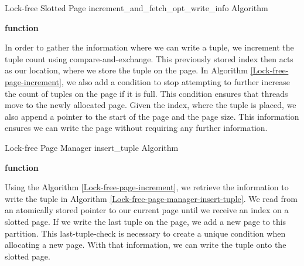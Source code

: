 \begin{algorithm}[h]
  \caption{Lock-free Slotted Page increment\_and\_fetch\_opt\_write\_info Algorithm}\label{Lock-free-page-increment}
  \textbf{function}
\end{algorithm}
In order to gather the information where we can write a tuple, we increment the tuple count using compare-and-exchange.
This previously stored index then acts as our location, where we store the tuple on the page.
In Algorithm \ref{Lock-free-page-increment}, we also add a condition to stop attempting to further increase the count of tuples on the page if it is full.
This condition ensures that threads move to the newly allocated page.
Given the index, where the tuple is placed, we also append a pointer to the start of the page and the page size.
This information ensures we can write the page without requiring any further information.

\begin{algorithm}[h]
  \caption{Lock-free Page Manager insert\_tuple Algorithm}\label{Lock-free-page-manager-insert-tuple}
  \textbf{function} \end{algorithm} Using the Algorithm \ref{Lock-free-page-increment}, we retrieve the information to write the tuple in Algorithm \ref{Lock-free-page-manager-insert-tuple}.
We read from an atomically stored pointer to our current page until we receive an index on a slotted page.
If we write the last tuple on the page, we add a new page to this partition.
This last-tuple-check is necessary to create a unique condition when allocating a new page.
With that information, we can write the tuple onto the slotted page.
